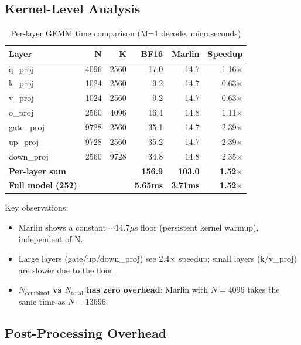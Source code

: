 \documentclass[11pt,a4paper]{article}
\begin{document}
\subsection{Kernel-Level Analysis}

\begin{table}[h]
\centering
\caption{Per-layer GEMM time comparison (M=1 decode, microseconds)}
\label{tab:kernel}
\begin{tabular}{lrrrrr}
\toprule
Layer & N & K & BF16 & Marlin & Speedup \\
\midrule
q\_proj & 4096 & 2560 & 17.0 & 14.7 & 1.16$\times$ \\
k\_proj & 1024 & 2560 & 9.2 & 14.7 & 0.63$\times$ \\
v\_proj & 1024 & 2560 & 9.2 & 14.7 & 0.63$\times$ \\
o\_proj & 2560 & 4096 & 16.4 & 14.8 & 1.11$\times$ \\
gate\_proj & 9728 & 2560 & 35.1 & 14.7 & 2.39$\times$ \\
up\_proj & 9728 & 2560 & 35.2 & 14.7 & 2.39$\times$ \\
down\_proj & 2560 & 9728 & 34.8 & 14.8 & 2.35$\times$ \\
\midrule
\textbf{Per-layer sum} & & & \textbf{156.9} & \textbf{103.0} & \textbf{1.52$\times$} \\
\textbf{Full model (252)} & & & \textbf{5.65ms} & \textbf{3.71ms} & \textbf{1.52$\times$} \\
\bottomrule
\end{tabular}
\end{table}

Key observations:
\begin{itemize}
    \item Marlin shows a constant $\sim$14.7$\mu$s floor (persistent kernel warmup), independent of N.
    \item Large layers (gate/up/down\_proj) see 2.4$\times$ speedup; small layers (k/v\_proj) are slower due to the floor.
    \item \textbf{$N_{\text{combined}}$ vs $N_{\text{total}}$ has zero overhead}: Marlin with $N{=}4096$ takes the same time as $N{=}13696$.
\end{itemize}

\subsection{Post-Processing Overhead}
\end{document}
